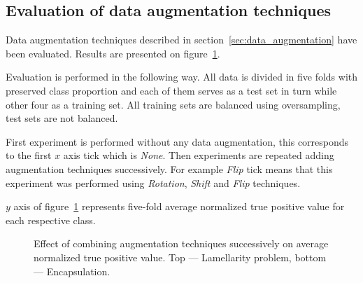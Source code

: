 \documentclass[a4paper, 11pt, table]{article}
\begin{document}
\subsection{Evaluation of data augmentation techniques}
Data augmentation techniques described in section~\ref{sec:data_augmentation} have been evaluated. Results are presented on figure~\ref{fig:augmentation_evaluation}. 

Evaluation is performed in the following way. All data is divided in five folds with preserved class proportion and each of them serves as a test set in turn while other four as a training set. All training sets are balanced using oversampling, test sets are not balanced. 

First experiment is performed without any data augmentation, this corresponds to the first $x$ axis tick which is \textit{None}. Then experiments are repeated adding augmentation techniques successively. For example \textit{Flip} tick means that this experiment was performed using \textit{Rotation}, \textit{Shift} and \textit{Flip} techniques.

$y$ axis of figure~\ref{fig:augmentation_evaluation} represents five-fold average normalized true positive value for each respective class. 

\begin{figure}[H]
\centering


\caption{\label{fig:augmentation_evaluation}Effect of combining augmentation techniques successively on average normalized true positive value. Top --- Lamellarity problem, bottom --- Encapsulation.}
\end{figure}
\end{document}
